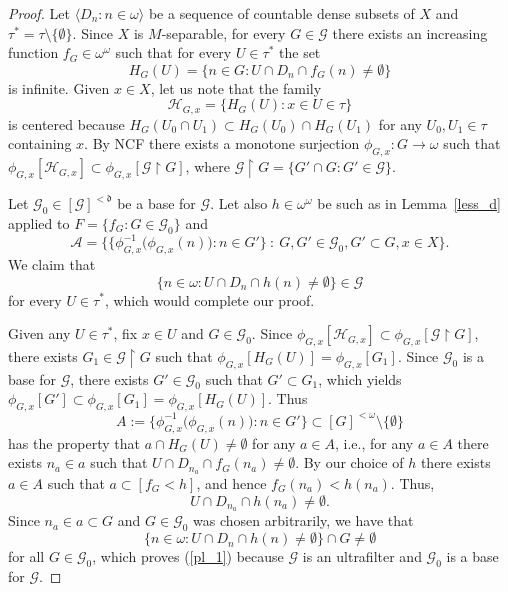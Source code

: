 \documentclass[10pt,a4paper]{amsart}
\newcommand{\A}{\mathcal{A}}
\newcommand{\CG}{\mathcal{G}}
\newcommand{\CH}{\mathcal{H}}
\newcommand{\hot}{\mathfrak}
\newcommand{\la}{\langle}
\newcommand{\ra}{\rangle}
\newcommand{\uhr}{\upharpoonright}
\newcommand{\w}{\omega}
\begin{document}
\begin{proof}
Let $\la D_n:n\in\w\ra$ be a sequence of countable dense subsets of 
$X$ and $\tau^*=\tau\setminus\{\emptyset\}$. Since $X$ is $M$-separable, for every $G\in\CG$ there exists an increasing function $f_G\in\w^\w$
such that for every $U\in\tau^*$ the set 
$$H_{G}(U)=\big\{n\in G: U\cap D_n\cap f_G(n)\neq\emptyset\big\}$$
is infinite. 
Given $x\in X$, let us note that the family
$$\CH_{G,x}=\{H_{G}(U):x\in U\in\tau\}$$
is centered
because $H_G(U_0\cap U_1)\subset H_G(U_0)\cap H_G(U_1)$
for any $U_0,U_1\in\tau$ containing $x$.
By NCF there exists a monotone surjection $\phi_{G,x}:G\to\w$ such that
$\phi_{G,x}[\CH_{G,x}]\subset\phi_{G,x}[\CG\uhr G]$,
where $\CG\uhr G=\{G'\cap G:G'\in\CG\}$.

Let $\CG_0\in [\CG]^{<\hot d}$ be a base for $\CG$.
Let also $h\in\w^\w$ be such as in 
 Lemma~\ref{less_d} applied to $F=\{f_G:G\in\CG_0\}$
and 
$$ \A=\big\{\{\phi_{G,x}^{-1}\big(\phi_{G,x}(n)\big):n\in G'\}\: :\: G,G'\in \CG_0, G'\subset G, x\in X\big\}. $$
We claim that 
\begin{equation}\label{pl_1}
 \{n\in\w:U\cap D_n\cap h(n)\neq\emptyset\}\in \CG 
 \end{equation}
for every $U\in\tau^*$, which would complete our proof.

Given any $U\in\tau^*$, fix $x\in U$ and $G\in\CG_0$.
Since $\phi_{G,x}[\CH_{G,x}]\subset\phi_{G,x}[\CG\uhr G]$,
there exists $G_1\in \CG\uhr G$ such that 
$\phi_{G,x}[H_G(U)]=\phi_{G,x}[G_1]$.
Since $\CG_0$ is a base for $\CG$, there exists 
$G'\in\CG_0$  such that $G'\subset G_1$, which yields 
$\phi_{G,x}[G']\subset \phi_{G,x}[G_1]=\phi_{G,x}[H_G(U)]$.
Thus 
$$A:=\{\phi_{G,x}^{-1}\big(\phi_{G,x}(n)\big):n\in G'\}\subset [G]^{<\w}\setminus\{\emptyset\}$$
has the property that $a\cap H_G(U)\neq\emptyset$
for any
$a\in A$, i.e., for any $a\in A$ there exists 
$n_a\in a$ such that $U\cap D_{n_a}\cap f_G(n_a)\neq\emptyset$.
By our choice of $h$ there exists $a\in A$ such that $a\subset [f_G<h]$,
and hence $f_G(n_a)<h(n_a)$. Thus,
$$ U\cap D_{n_a}\cap h(n_a)\neq\emptyset. $$
Since $n_a\in a\subset G$ and $G\in\CG_0$ was chosen arbitrarily,
we have that 
$$ \big\{n\in\w:U\cap D_n\cap h(n)\neq\emptyset\big\}\cap G\neq\emptyset$$
for all $G\in\CG_0$, which proves (\ref{pl_1}) because $\CG$
is an ultrafilter and $\CG_0$ is a base for $\CG$.
\end{proof}
\end{document}
